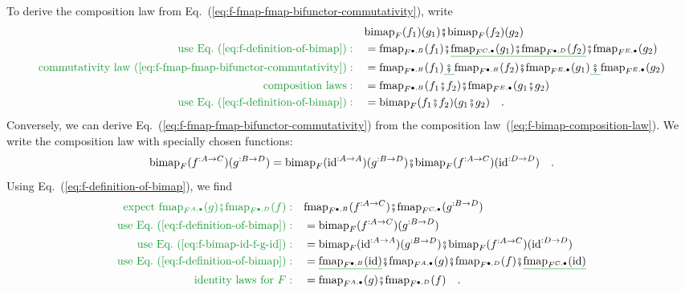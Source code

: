 To derive the composition law from Eq.~(\ref{eq:f-fmap-fmap-bifunctor-commutativity}),
write
\begin{align*}
 & \text{bimap}_{F}(f_{1})(g_{1})\bef\text{bimap}_{F}(f_{2})(g_{2})\\
{\color{greenunder}\text{use Eq.~(\ref{eq:f-definition-of-bimap})}:}\quad & =\text{fmap}_{F^{\bullet,B}}(f_{1})\bef\gunderline{\text{fmap}_{F^{C,\bullet}}(g_{1})\bef\text{fmap}_{F^{\bullet,D}}(f_{2})}\bef\text{fmap}_{F^{E,\bullet}}(g_{2})\\
{\color{greenunder}\text{commutativity law~(\ref{eq:f-fmap-fmap-bifunctor-commutativity})}:}\quad & =\text{fmap}_{F^{\bullet,B}}(f_{1})\gunderline{\,\bef\,}\text{fmap}_{F^{\bullet,B}}(f_{2})\bef\text{fmap}_{F^{E,\bullet}}(g_{1})\gunderline{\,\bef\,}\text{fmap}_{F^{E,\bullet}}(g_{2})\\
{\color{greenunder}\text{composition laws}:}\quad & =\text{fmap}_{F^{\bullet,B}}(f_{1}\bef f_{2})\bef\text{fmap}_{F^{E,\bullet}}(g_{1}\bef g_{2})\\
{\color{greenunder}\text{use Eq.~(\ref{eq:f-definition-of-bimap})}:}\quad & =\text{bimap}_{F}(f_{1}\bef f_{2})(g_{1}\bef g_{2})\quad.
\end{align*}
Conversely, we can derive Eq.~(\ref{eq:f-fmap-fmap-bifunctor-commutativity})
from the composition law~(\ref{eq:f-bimap-composition-law}). We
write the composition law with specially chosen functions:
\begin{equation}
\text{bimap}_{F}(f^{:A\rightarrow C})(g^{:B\rightarrow D})=\text{bimap}_{F}(\text{id}^{:A\rightarrow A})(g^{:B\rightarrow D})\bef\text{bimap}_{F}(f^{:A\rightarrow C})(\text{id}^{:D\rightarrow D})\quad.\label{eq:f-bimap-id-f-g-id}
\end{equation}
Using Eq.~(\ref{eq:f-definition-of-bimap}), we find
\begin{align*}
{\color{greenunder}\text{expect }\text{fmap}_{F^{A,\bullet}}(g)\bef\text{fmap}_{F^{\bullet,D}}(f):}\quad & \text{fmap}_{F^{\bullet,B}}(f^{:A\rightarrow C})\bef\text{fmap}_{F^{C,\bullet}}(g^{:B\rightarrow D})\\
{\color{greenunder}\text{use Eq.~(\ref{eq:f-definition-of-bimap})}:}\quad & =\text{bimap}_{F}(f^{:A\rightarrow C})(g^{:B\rightarrow D})\\
{\color{greenunder}\text{use Eq.~(\ref{eq:f-bimap-id-f-g-id})}:}\quad & =\text{bimap}_{F}(\text{id}^{:A\rightarrow A})(g^{:B\rightarrow D})\bef\text{bimap}_{F}(f^{:A\rightarrow C})(\text{id}^{:D\rightarrow D})\\
{\color{greenunder}\text{use Eq.~(\ref{eq:f-definition-of-bimap})}:}\quad & =\gunderline{\text{fmap}_{F^{\bullet,B}}(\text{id})}\bef\text{fmap}_{F^{A,\bullet}}(g)\bef\text{fmap}_{F^{\bullet,D}}(f)\bef\gunderline{\text{fmap}_{F^{C,\bullet}}(\text{id})}\\
{\color{greenunder}\text{identity laws for }F:}\quad & =\text{fmap}_{F^{A,\bullet}}(g)\bef\text{fmap}_{F^{\bullet,D}}(f)\quad.
\end{align*}

